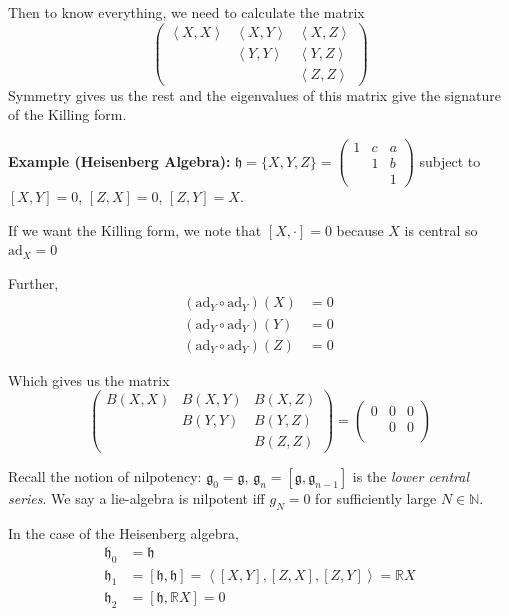 \documentclass[12pt]{article}
\newcommand{\R}{\mathbb{R}}
\newcommand{\N}{\mathbb{N}}
\newcommand{\brak}[1]{\left\langle #1 \right\rangle}
\newcommand{\g}{\mathfrak{g}}
\newcommand{\h}{\mathfrak{h}}
\begin{document}
    Then to know everything, we need to calculate the matrix 
    \[\begin{pmatrix}
        \brak{X, X} & \brak{X, Y} & \brak{X, Z}\\ 
        & \brak{Y, Y} & \brak{Y, Z}\\ 
        & & \brak{Z, Z}
    \end{pmatrix}\] 
    Symmetry gives us the rest and the eigenvalues of this matrix give the signature of the Killing form.

    \textbf{Example (Heisenberg Algebra):} $\h = \{X, Y, Z\} = \begin{pmatrix}
        1 & c & a\\ 
        & 1 & b\\ 
        & & 1
    \end{pmatrix}$ subject to $[X, Y] = 0$, $[Z, X] = 0$, $[Z, Y] = X$. 

    If we want the Killing form, we note that $[X, \cdot] = 0$ because $X$ is central so $\text{ad}_X = 0$

    Further, 
    \begin{align*}
        (\text{ad}_Y \circ \text{ad}_Y)(X) &= 0\\
        (\text{ad}_Y \circ \text{ad}_Y)(Y) &= 0\\ 
        (\text{ad}_Y \circ \text{ad}_Y)(Z) &= 0\
    \end{align*}

    Which gives us the matrix 
    \[\begin{pmatrix}
        B(X, X) & B(X, Y) & B(X, Z)\\
        & B(Y, Y) & B(Y, Z)\\
        & & B(Z, Z)
    \end{pmatrix} = \begin{pmatrix}
        0 & 0 & 0\\ 
        & 0 & 0\\ 

    \end{pmatrix}\]

    Recall the notion of nilpotency: $\g_0 = \g$, $\g_n = [\g, \g_{n-1}]$ is the \emph{lower central series}. We say a lie-algebra is nilpotent iff $g_N = 0$ for sufficiently large $N \in \N$. 
    
    In the case of the Heisenberg algebra, 
    \begin{align*}
        \h_0 &= \h\\ 
        \h_1 &= [\h, \h] = \brak{[X, Y], [Z, X], [Z, Y]} = \R X\\ 
        \h_2 &= [\h, \R X] = 0
    \end{align*}
\end{document}
